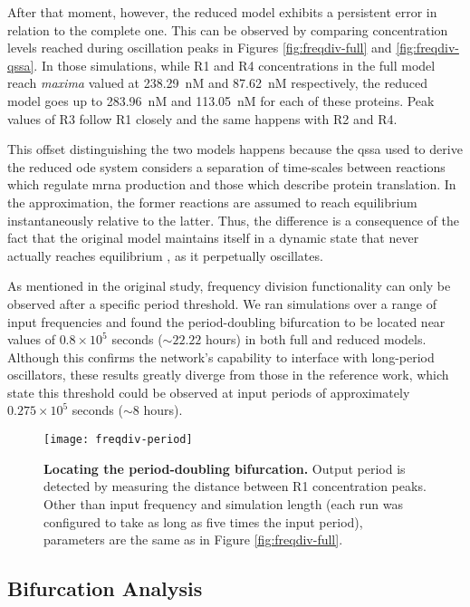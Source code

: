     After that moment, however, the reduced model exhibits a persistent error in relation to the complete one.
    This can be observed by comparing concentration levels reached during oscillation peaks in Figures \ref{fig:freqdiv-full} and \ref{fig:freqdiv-qssa}.
    In those simulations, while R1 and R4 concentrations in the full model reach \textit{maxima} valued at \SI{238.29}{\nano M} and \SI{87.62}{\nano M} respectively, the reduced model goes up to \SI{283.96}{\nano M} and \SI{113.05}{\nano M} for each of these proteins.
    Peak values of R3 follow R1 closely and the same happens with R2 and R4.

    This offset distinguishing the two models happens because the \ac{qssa} used to derive the reduced \ac{ode} system considers a separation of time-scales between reactions which regulate \acs{mrna} production and those which describe protein translation.
    In the approximation, the former reactions are assumed to reach equilibrium instantaneously relative to the latter.
    Thus, the difference is a consequence of the fact that the original model maintains itself in a dynamic state that never actually reaches equilibrium \cite{ingalls}, as it perpetually oscillates.

    As mentioned in the original study, frequency division functionality can only be observed after a specific period threshold.
    We ran simulations over a range of input frequencies and found the period-doubling bifurcation to be located near values of $0.8 \times 10^5$ seconds ($\sim 22.22$ hours) in both full and reduced models.
    Although this confirms the network's capability to interface with long-period oscillators, these results greatly diverge from those in the reference work, which state this threshold could be observed at input periods of approximately $0.275 \times 10^5$ seconds ($\sim 8$ hours).

    \begin{figure}[!htb]
      \centering
      \texttt{[image: freqdiv-period]}
      \caption{\textbf{Locating the period-doubling bifurcation.} Output period is detected by measuring the distance between R1 concentration peaks. Other than input frequency and simulation length (each run was configured to take as long as five times the input period), parameters are the same as in Figure \ref{fig:freqdiv-full}.}
      \label{fig:freqdiv-period}
    \end{figure}


  \subsection{Bifurcation Analysis}

